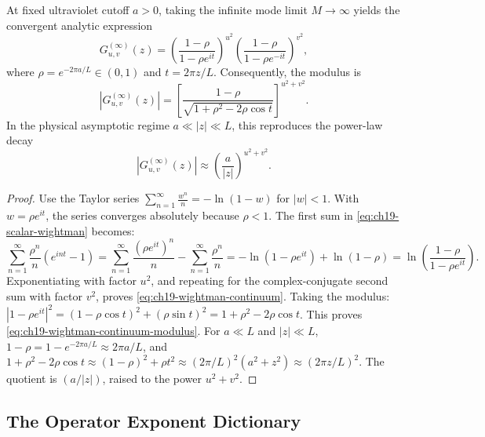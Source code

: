 \begin{theorem}
\label{thm:ch19-continuum-wightman}
At fixed ultraviolet cutoff $a > 0$, taking the infinite mode limit $M \to \infty$ yields
the convergent analytic expression
\begin{equation}
 G_{u,v}^{(\infty)}(z)
  = \left( \frac{1 - \rho}{1 - \rho e^{i t}} \right)^{u^2}
    \left( \frac{1 - \rho}{1 - \rho e^{-i t}} \right)^{v^2},
 \label{eq:ch19-wightman-continuum}
\end{equation}
where $\rho = e^{-2\pi a / L} \in (0, 1)$ and $t = 2\pi z / L$.
Consequently, the modulus is
\begin{equation}
 |G_{u,v}^{(\infty)}(z)|
  = \left[ \frac{1 - \rho}{\sqrt{1 + \rho^2 - 2\rho\cos t}} \right]^{u^2+v^2}.
 \label{eq:ch19-wightman-continuum-modulus}
\end{equation}
In the physical asymptotic regime $a \ll |z| \ll L$, this reproduces the power-law decay
\begin{equation}
 |G_{u,v}^{(\infty)}(z)| \approx \left( \frac{a}{|z|} \right)^{u^2+v^2}.
 \label{eq:ch19-asymptotic-power-law}
\end{equation}
\end{theorem}
\begin{proof}
Use the Taylor series $\sum_{n=1}^\infty \frac{w^n}{n} = -\ln(1 - w)$ for $|w| < 1$.
With $w = \rho e^{i t}$, the series converges absolutely because $\rho < 1$.
The first sum in \eqref{eq:ch19-scalar-wightman} becomes:
\[
 \sum_{n=1}^\infty \frac{\rho^n}{n} (e^{i n t} - 1)
  = \sum_{n=1}^\infty \frac{(\rho e^{i t})^n}{n} - \sum_{n=1}^\infty \frac{\rho^n}{n}
  = -\ln(1 - \rho e^{i t}) + \ln(1 - \rho)
  = \ln\left( \frac{1 - \rho}{1 - \rho e^{i t}} \right).
\]
Exponentiating with factor $u^2$, and repeating for the complex-conjugate second sum with factor $v^2$,
proves \eqref{eq:ch19-wightman-continuum}.
Taking the modulus:
$|1 - \rho e^{i t}|^2 = (1 - \rho\cos t)^2 + (\rho\sin t)^2 = 1 + \rho^2 - 2\rho\cos t$.
This proves \eqref{eq:ch19-wightman-continuum-modulus}.
For $a \ll L$ and $|z| \ll L$, $1 - \rho = 1 - e^{-2\pi a/L} \approx 2\pi a / L$,
and $1 + \rho^2 - 2\rho\cos t \approx (1-\rho)^2 + \rho t^2 \approx (2\pi/L)^2 (a^2 + z^2) \approx (2\pi z / L)^2$.
The quotient is $(a/|z|)$, raised to the power $u^2+v^2$.
\end{proof}

\subsection*{The Operator Exponent Dictionary}

